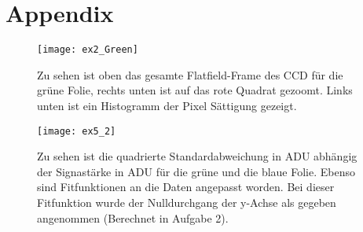 \section{Appendix}

\begin{figure}[H]
	\centering
	\texttt{[image: ex2\_Green]}
	\caption{Zu sehen ist oben das gesamte Flatfield-Frame des CCD für die grüne Folie, rechts unten ist auf das rote Quadrat gezoomt. Links unten ist ein Histogramm der  Pixel Sättigung gezeigt. }
	\label{blau_aufgabe3}
\end{figure}
\begin{figure}[H]
	\centering
	\texttt{[image: ex5\_2]}
	\caption{Zu sehen ist die quadrierte Standardabweichung in ADU abhängig der Signastärke in ADU für die grüne und die blaue Folie. Ebenso sind Fitfunktionen an die Daten angepasst worden. Bei dieser Fitfunktion wurde der Nulldurchgang der y-Achse als gegeben angenommen (Berechnet in Aufgabe 2).}
	\label{fig:ex5_2}
\end{figure}